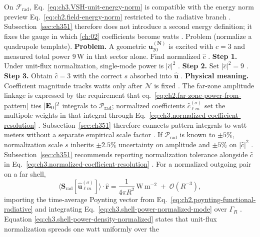 On \(\mathcal{F}_{\mathrm{rad}}\), Eq.~\eqref{eq:ch3.VSH-unit-energy-norm} is compatible with the energy norm preview
Eq.~\eqref{eq:ch2.field-energy-norm} restricted to the radiative branch \cite{stratton1941}. Subsection~\ref{sec:ch351}
therefore does not introduce a second energy definition; it fixes the gauge in which \ref{ch:02} coefficients
become watts \cite{poynting1884}.
Problem (normalize a quadrupole template). \textbf{Problem.} A geometric \(\mathbf{u}_{20}^{(\mathbf{N})}\) is excited with \(c=3\) and measured total power
\(9\,\mathrm{W}\) in that sector alone. Find normalized \(\widehat{c}\) \cite{harrington2001}.
\textbf{Step 1.} Under unit-flux normalization, single-mode power is \(|\widehat{c}|^{2}\) \cite{stratton1941}.
\textbf{Step 2.} Set \(|\widehat{c}|^{2}=9\) \cite{poynting1884}.
\textbf{Step 3.} Obtain \(\widehat{c}=3\) with the correct \(s\) absorbed into \(\widehat{\mathbf{u}}\) \cite{hansen1988}.
\textbf{Physical meaning.} Coefficient magnitude tracks watts only after \(\mathcal{N}\) is fixed \cite{harrington2001}.
The far-zone amplitude linkage is expressed by the requirement that eq.~\eqref{eq:ch2.far-zone-power-from-pattern} ties \(|\mathbf{E}_{0}|^{2}\) integrals to \(\mathcal{P}_{\mathrm{rad}}\); normalized coefficients
\(\widehat{c}_{\ell m}^{(\sigma)}\) set the multipole weights in that integral through
Eq.~\eqref{eq:ch3.normalized-coefficient-resolution} \cite{stratton1941}. Subsection~\ref{sec:ch351}
therefore connects pattern integrals to watt meters without a separate empirical scale factor \cite{poynting1884}.
If \(\mathcal{P}_{\mathrm{rad}}\) is known to \(\pm5\%\), normalization scale \(s\) inherits \(\pm2.5\%\) uncertainty on
amplitude and \(\pm5\%\) on \(|\widehat{c}|^{2}\) \cite{harrington2001}. Subsection~\ref{sec:ch351} recommends
reporting normalization tolerance alongside \(\widehat{c}\) in Eq.~\eqref{eq:ch3.normalized-coefficient-resolution}
\cite{harrington2001}.
For a normalized outgoing pair on a far shell,
\begin{equation}
\label{eq:ch3.shell-power-density-normalized}
\langle\mathbf{S}_{\mathrm{rad}}[\widehat{\mathbf{u}}_{\ell m}^{(\sigma)}]\rangle\cdot\hat{\mathbf{r}}
=
\frac{1}{4\pi R^{2}}\,\mathrm{W\,m^{-2}}
\;+\;\mathcal{O}(R^{-3}),
\end{equation}
importing the time-average Poynting vector from Eq.~\eqref{eq:ch2.poynting-functional-radiative} and integrating
Eq.~\eqref{eq:ch3.shell-power-normalized-mode} over \(\Gamma_R\) \cite{poynting1884}. Equation
\eqref{eq:ch3.shell-power-density-normalized} states that unit-flux normalization spreads one watt uniformly over the
